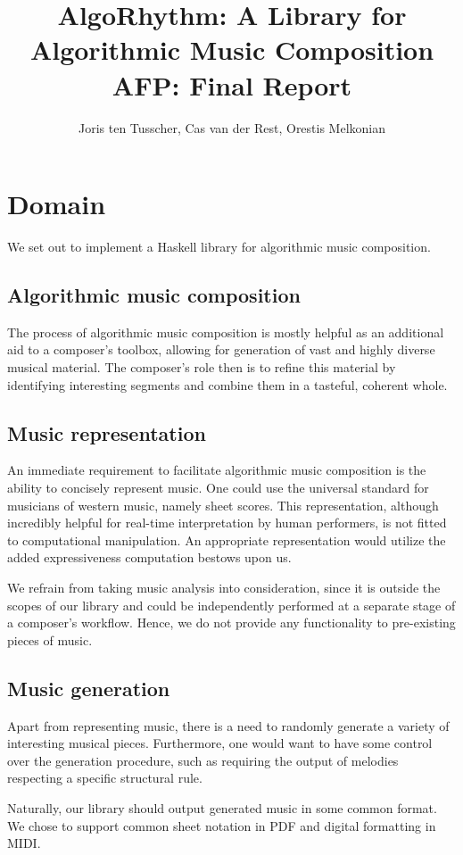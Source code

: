 \documentclass[11pt,a4paper]{article}
\title{\textbf{\Large{AlgoRhythm: A Library for Algorithmic Music Composition} \\ \small{AFP: Final Report}}}
\author{\small{Joris ten Tusscher, Cas van der Rest, Orestis Melkonian}}
\date{}
\begin{document}
\maketitle

\section{Domain}
We set out to implement a Haskell library for algorithmic music composition.
\subsection{Algorithmic music composition}
The process of algorithmic music composition is mostly helpful as an additional aid to a composer's toolbox, allowing for generation of vast and highly diverse musical material. The composer's role then is to refine this material by identifying interesting segments and combine them in a tasteful, coherent whole.
\subsection{Music representation}
An immediate requirement to facilitate algorithmic music composition is the ability to concisely represent music. One could use the universal standard for musicians of western music, namely sheet scores. This representation, although incredibly helpful for real-time interpretation by human performers, is not fitted to computational manipulation. An appropriate representation would utilize the added expressiveness computation bestows upon us.

We refrain from taking music analysis into consideration, since it is outside the scopes of our library and could be independently performed at a separate stage of a composer's workflow. Hence, we do not provide any functionality  to pre-existing pieces of music.

\subsection{Music generation}
Apart from representing music, there is a need to randomly generate a variety of interesting musical pieces. Furthermore, one would want to have some control over the generation procedure, such as requiring the output of melodies respecting a specific structural rule.

Naturally, our library should output generated music in some common format. We chose to support common sheet notation in PDF and digital formatting in MIDI.
\end{document}
